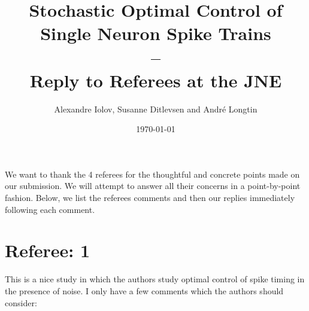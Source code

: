 \documentclass{article}
\begin{document}
\title{Stochastic Optimal Control of Single Neuron Spike Trains\\
--\\
Reply to Referees at the JNE} 

\author{Alexandre Iolov, 
Susanne Ditlevsen 
and
Andr\'e Longtin
}

\date{\today}

\maketitle 



\vskip 20pt

We want to thank the 4 referees for the thoughtful and concrete points made on
our submission. We will attempt to answer all their concerns in a point-by-point
fashion. Below, we list the referees comments and then our replies immediately
following each comment.
\tableofcontents

\clearpage
\section{Referee: 1}
This is a nice study in which the authors study optimal control of spike timing in the presence of noise. I only have a few comments which the authors should consider:
\end{document}
